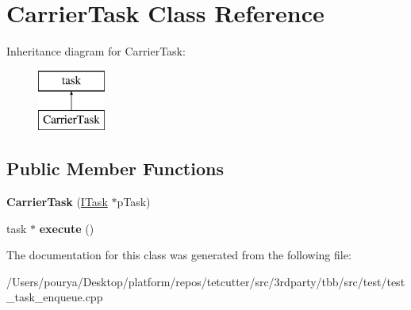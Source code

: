 \hypertarget{classCarrierTask}{}\section{Carrier\+Task Class Reference}
\label{classCarrierTask}
Inheritance diagram for Carrier\+Task\+:\begin{figure}[H]
\begin{center}
\leavevmode
\includegraphics[height=2.000000cm]{classCarrierTask}
\end{center}
\end{figure}
\subsection*{Public Member Functions}
\begin{DoxyCompactItemize}
\item 
\hypertarget{classCarrierTask_abb766ee1118d02825f8e0dd21b0fcad6}{}{\bfseries Carrier\+Task} (\hyperlink{classITask}{I\+Task} $\ast$p\+Task)\label{classCarrierTask_abb766ee1118d02825f8e0dd21b0fcad6}

\item 
\hypertarget{classCarrierTask_a9363087d443bf8b7b035b2a37529fc5c}{}task $\ast$ {\bfseries execute} ()\label{classCarrierTask_a9363087d443bf8b7b035b2a37529fc5c}

\end{DoxyCompactItemize}


The documentation for this class was generated from the following file\+:\begin{DoxyCompactItemize}
\item 
/\+Users/pourya/\+Desktop/platform/repos/tetcutter/src/3rdparty/tbb/src/test/test\+\_\+task\+\_\+enqueue.\+cpp\end{DoxyCompactItemize}
